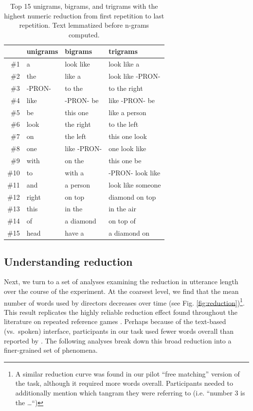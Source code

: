 \documentclass[alpha-refs]{wiley-article}
\begin{document}
\begin{table}[t]
\centering
\begin{tabular}{|r||l|l|l|}
  \hline
 & unigrams & bigrams & trigrams \\ 
  \hline
\#1 & a & look like & look like a \\ 
  \#2 & the & like a & look like -PRON- \\ 
  \#3 & -PRON- & to the & to the right \\ 
  \#4 & like & -PRON- be & like -PRON- be \\ 
  \#5 & be & this one & like a person \\ 
  \#6 & look & the right & to the left \\ 
  \#7 & on & the left & this one look \\ 
  \#8 & one & like -PRON- & one look like \\ 
  \#9 & with & on the & this one be \\ 
  \#10 & to & with a & -PRON- look like \\ 
  \#11 & and & a person & look like someone \\ 
  \#12 & right & on top & diamond on top \\ 
  \#13 & this & in the & in the air \\ 
  \#14 & of & a diamond & on top of \\ 
  \#15 & head & have a & a diamond on \\ 
   \hline
\end{tabular}
\caption{Top 15 unigrams, bigrams, and trigrams with the highest numeric reduction from first repetition to last repetition. Text lemmatized before n-grams computed. } 
\label{tab:words}
\end{table}


\subsection{Understanding reduction}\label{reduction}

Next, we turn to a set of analyses examining the reduction in utterance length over the course of the experiment. 
At the coarsest level, we find that the mean number of words used by directors decreases over time (see Fig. \ref{fig:reduction})\footnote{A similar reduction curve was found in our pilot ``free matching'' version of the task, although it required more words overall. Participants needed to additionally mention which tangram they were referring to (i.e. ``number 3 is the \dots``)}.
This result replicates the highly reliable reduction effect found throughout the literature on repeated reference games \citep[e.g.][]{KraussWeinheimer64_ReferencePhrases,BrennanClark96_ConceptualPactsConversation}. 
Perhaps because of the text-based (vs.~spoken) interface, participants in our task used fewer words overall than reported by \cite{ClarkWilkesGibbs86_ReferringCollaborative}. 
The following analyses break down this broad reduction into a finer-grained set of phenomena.
\end{document}
